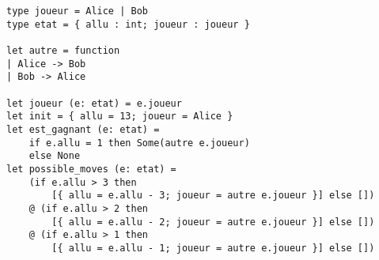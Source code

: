 \begin{lstlisting}[language=caml,caption={Représentation machine du jeux des allumettes}]
type joueur = Alice | Bob
type etat = { allu : int; joueur : joueur }

let autre = function
| Alice -> Bob
| Bob -> Alice

let joueur (e: etat) = e.joueur
let init = { allu = 13; joueur = Alice }
let est_gagnant (e: etat) = 
	if e.allu = 1 then Some(autre e.joueur)
	else None
let possible_moves (e: etat) = 
	(if e.allu > 3 then
		[{ allu = e.allu - 3; joueur = autre e.joueur }] else [])
	@ (if e.allu > 2 then
		[{ allu = e.allu - 2; joueur = autre e.joueur }] else [])
	@ (if e.allu > 1 then
		[{ allu = e.allu - 1; joueur = autre e.joueur }] else [])
\end{lstlisting}


